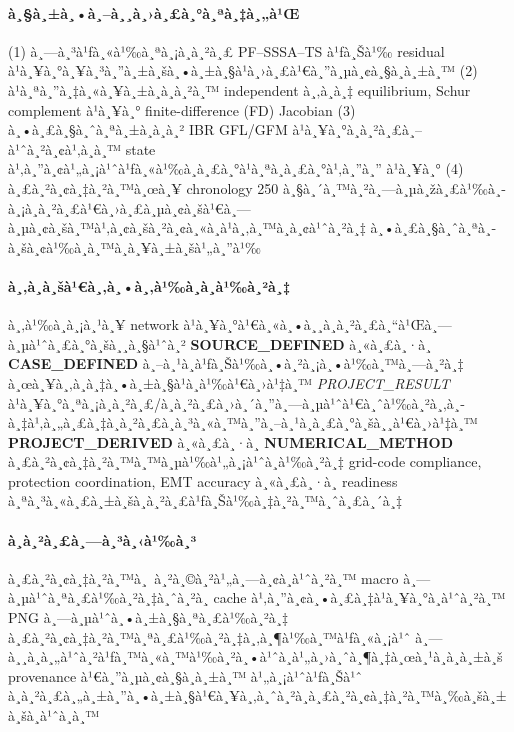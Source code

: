 ﻿\documentclass[12pt,a4paper]{article}
\newcommand{\source}[1]{\textbf{#1}}
\newcommand{\result}[1]{\textit{#1}}
\begin{document}
\paragraph{à¸§à¸±à¸•à¸–à¸¸à¸›à¸£à¸°à¸ªà¸‡à¸„à¹Œ}
(1) à¸—à¸³à¹ƒà¸«à¹‰à¸ªà¸¡à¸à¸²à¸£ PF--SSSA--TS à¹ƒà¸Šà¹‰ residual à¹à¸¥à¸°à¸¥à¸³à¸”à¸±à¸šà¸•à¸±à¸§à¹à¸›à¸£à¹€à¸”à¸µà¸¢à¸§à¸à¸±à¸™
(2) à¹à¸ªà¸”à¸‡à¸«à¸¥à¸±à¸à¸à¸²à¸™ independent à¸‚à¸­à¸‡ equilibrium, Schur complement à¹à¸¥à¸°
finite-difference (FD) Jacobian
(3) à¸•à¸£à¸§à¸ˆà¸ªà¸±à¸à¸à¸² IBR GFL/GFM à¹à¸¥à¸°à¸à¸²à¸£à¸–à¹ˆà¸²à¸¢à¹‚à¸­à¸™ state à¹‚à¸”à¸¢à¹„à¸¡à¹ˆà¹ƒà¸«à¹‰à¸à¸£à¸°à¹à¸ªà¸à¸£à¸°à¹‚à¸”à¸”
à¹à¸¥à¸° (4) à¸£à¸²à¸¢à¸‡à¸²à¸™à¸œà¸¥ chronology 250 à¸§à¸´à¸™à¸²à¸—à¸µà¸žà¸£à¹‰à¸­à¸¡à¸à¸²à¸£à¹€à¸›à¸£à¸µà¸¢à¸šà¹€à¸—à¸µà¸¢à¸šà¸™à¹‚à¸¢à¸šà¸²à¸¢à¸«à¸à¹à¸‚à¸™à¸­à¸¢à¹ˆà¸²à¸‡
à¸•à¸£à¸§à¸ˆà¸ªà¸­à¸šà¸¢à¹‰à¸­à¸™à¸à¸¥à¸±à¸šà¹„à¸”à¹‰

\paragraph{à¸‚à¸­à¸šà¹€à¸‚à¸•à¸‚à¹‰à¸­à¸­à¹‰à¸²à¸‡}
à¸‚à¹‰à¸­à¸¡à¸¹à¸¥ network à¹à¸¥à¸°à¹€à¸«à¸•à¸¸à¸à¸²à¸£à¸“à¹Œà¸—à¸µà¹ˆà¸£à¸°à¸šà¸¸à¸§à¹ˆà¸² \source{SOURCE\_DEFINED} à¸«à¸£à¸·à¸­
\source{CASE\_DEFINED} à¸–à¸¹à¸à¹ƒà¸Šà¹‰à¸•à¸²à¸¡à¸•à¹‰à¸™à¸—à¸²à¸‡ à¸œà¸¥à¸‚à¸­à¸‡à¸•à¸±à¸§à¹à¸à¹‰à¹€à¸›à¹‡à¸™
\result{PROJECT\_RESULT} à¹à¸¥à¸°à¸ªà¸¡à¸à¸²à¸£/à¸à¸²à¸£à¸›à¸´à¸”à¸—à¸µà¹ˆà¹€à¸ˆà¹‰à¸²à¸‚à¸­à¸‡à¹‚à¸„à¸£à¸‡à¸à¸²à¸£à¸à¸³à¸«à¸™à¸”à¸–à¸¹à¸à¸£à¸°à¸šà¸¸à¹€à¸›à¹‡à¸™
\source{PROJECT\_DERIVED} à¸«à¸£à¸·à¸­ \source{NUMERICAL\_METHOD} à¸£à¸²à¸¢à¸‡à¸²à¸™à¸™à¸µà¹‰à¹„à¸¡à¹ˆà¸­à¹‰à¸²à¸‡
grid-code compliance, protection coordination, EMT accuracy à¸«à¸£à¸·à¸­ readiness
à¸ªà¸³à¸«à¸£à¸±à¸šà¸à¸²à¸£à¹ƒà¸Šà¹‰à¸‡à¸²à¸™à¸ˆà¸£à¸´à¸‡

\paragraph{à¸à¸²à¸£à¸—à¸³à¸‹à¹‰à¸³}
à¸£à¸²à¸¢à¸‡à¸²à¸™à¸ à¸²à¸©à¸²à¹„à¸—à¸¢à¸­à¹ˆà¸²à¸™ macro à¸—à¸µà¹ˆà¸ªà¸£à¹‰à¸²à¸‡à¸ˆà¸²à¸ cache à¹‚à¸”à¸¢à¸•à¸£à¸‡à¹à¸¥à¸°à¸­à¹ˆà¸²à¸™ PNG à¸—à¸µà¹ˆà¸•à¸±à¸§à¸ªà¸£à¹‰à¸²à¸‡
à¸£à¸²à¸¢à¸‡à¸²à¸™à¸ªà¸£à¹‰à¸²à¸‡à¸‚à¸¶à¹‰à¸™à¹ƒà¸«à¸¡à¹ˆ à¸—à¸¸à¸à¸„à¹ˆà¸²à¹ƒà¸™à¸«à¸™à¹‰à¸²à¸•à¹ˆà¸­à¹„à¸›à¸ˆà¸¶à¸‡à¸œà¸¹à¸à¸à¸±à¸š provenance à¹€à¸”à¸µà¸¢à¸§à¸à¸±à¸™ à¹„à¸¡à¹ˆà¹ƒà¸Šà¹ˆ
à¸à¸²à¸£à¸„à¸±à¸”à¸•à¸±à¸§à¹€à¸¥à¸‚à¸ˆà¸²à¸à¸£à¸²à¸¢à¸‡à¸²à¸™à¸‰à¸šà¸±à¸šà¸à¹ˆà¸­à¸™

\par\vspace{5pt}
\end{document}
